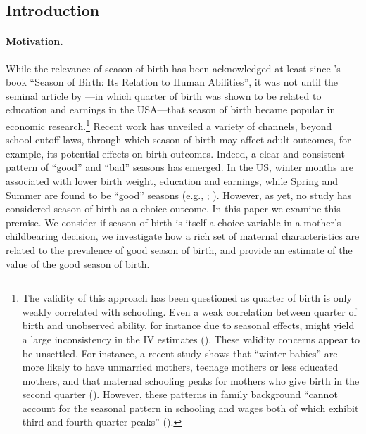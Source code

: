\documentclass[a4paper, 12 pt]{article}
\theoremstyle{plain}
\begin{document}
\newpage
\begin{doublespace}

\section{Introduction}
\paragraph{Motivation.} While the relevance of season of birth has been acknowledged at least since \citeauthor{Huntington38}'s \citeyear{Huntington38} book ``Season of Birth: Its Relation to Human Abilities'', it was not until the seminal article by \citet{AK1991}---in which quarter of birth was shown to be related to education and earnings in the USA---that season of birth became popular in economic research.\footnote{The validity of this approach has been questioned as quarter of birth is only weakly correlated with schooling. Even a weak correlation between quarter of birth and unobserved ability, for instance due to seasonal effects, might yield a large inconsistency in the IV estimates (\citealp{bound1995problems}). These validity concerns appear to be unsettled. For instance, a recent study shows that ``winter babies'' are more likely to have unmarried mothers, teenage mothers or less educated mothers, and that maternal schooling peaks for mothers who give birth in the second quarter (\citealp{BucklesHungerman2013}). However, these patterns in family background ``cannot account for the seasonal pattern in schooling and wages both of which exhibit third and fourth quarter peaks'' (\citealp{angrist2014mastering}).}  Recent work has unveiled a variety of channels, beyond school cutoff laws, through which season of birth may affect adult outcomes, for example, its potential effects on birth outcomes. Indeed, a clear and consistent pattern of ``good'' and ``bad'' seasons has emerged. In the US, winter months are associated with lower birth weight, education and earnings, while Spring and Summer are found to be ``good'' seasons (e.g., \citealp{BucklesHungerman2013}; \citealp{CS2013}). However, as yet, no study has considered season of birth as a choice outcome.  In this paper we examine this premise.  We consider if season of birth is itself a choice variable in a mother's childbearing decision, we investigate how a rich set of maternal characteristics are related to the prevalence of good season of birth, and provide an estimate of the value of the good season of birth.


\end{doublespace}
\end{document}
